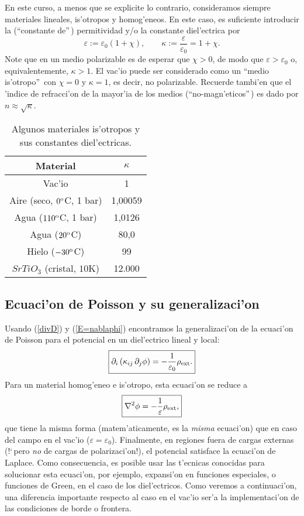 En este curso, a menos que se explicite lo contrario, consideramos siempre
materiales lineales, is'otropos y homog'eneos. En este caso, es suficiente
introducir la (``constante de''\,) permitividad y/o la constante diel'ectrica
por
\begin{equation}
\varepsilon:=\varepsilon_0(1+\chi), \qquad
\kappa:=\frac{\varepsilon}{\varepsilon_0}=1+\chi.
\end{equation}
Note que en un medio polarizable es de esperar que $\chi>0$, de modo que
$\varepsilon>\varepsilon_0$ o, equivalentemente, $\kappa>1$. El vac'io puede ser
considerado como un ``medio is'otropo''\, con $\chi=0$ y $\kappa=1$, es decir, no polarizable.
Recuerde tambi'en que el 'indice de refracci'on de la mayor'ia de los medios
(``no-magn'eticos''\,) es dado por $n\approx\sqrt{\kappa}$.
\begin{table}[!h]
\begin{center}
\begin{tabular}{c|c}
Material &   $\kappa$ \\ \hline\hline
Vac'io & 1 \\
Aire (seco, $0^{\rm o}$C, 1 bar)  & 1,00059 \\
Agua ($110^{\rm o}$C, 1 bar)  & 1,0126 \\
Agua ($20^{\rm o}$C) &  80,0 \\
Hielo ($-30^{\rm o}$C) &  99 \\
$SrTiO_3$ (cristal, $10$K)  & 12.000 \\
\end{tabular}
\caption{Algunos materiales is'otropos y sus constantes diel'ectricas.}
\end{center}
\end{table}

\subsection{Ecuaci'on de Poisson y su generalizaci'on}

Usando (\ref{divD}) y (\ref{E=nablaphi}) encontramos la generalizaci'on de la
ecuaci'on de Poisson para el potencial en un diel'ectrico lineal y local:
\begin{equation}
 \boxed{\partial_i\left(\kappa_{ij}\,\partial_j \phi\right)
=-\frac{1}{\varepsilon_0}\rho_{\rm ext}.}
\end{equation}
Para un material homog'eneo e is'otropo, esta ecuaci'on se reduce a
\begin{equation}\label{Poissond}
 \boxed{\nabla^2\phi=-\frac{1}{\varepsilon}\rho_{\rm ext},}
\end{equation}
que tiene la misma forma (matem'aticamente, es la \textit{misma} ecuaci'on) que
en caso del campo en el vac'io ($\varepsilon=\varepsilon_0$). Finalmente, en
regiones fuera de cargas externas (!`\,pero \textit{no} de cargas de
polarizaci'on!), el potencial satisface la ecuaci'on de Laplace. Como
consecuencia, es posible usar las t'ecnicas conocidas para solucionar esta ecuaci'on, por ejemplo, expansi'on en funciones especiales, o funciones de Green, en el caso de los diel'ectricos.
Como veremos a continuaci'on, una diferencia importante respecto al caso en el
vac'io ser'a la implementaci'on de las condiciones de borde o frontera.


